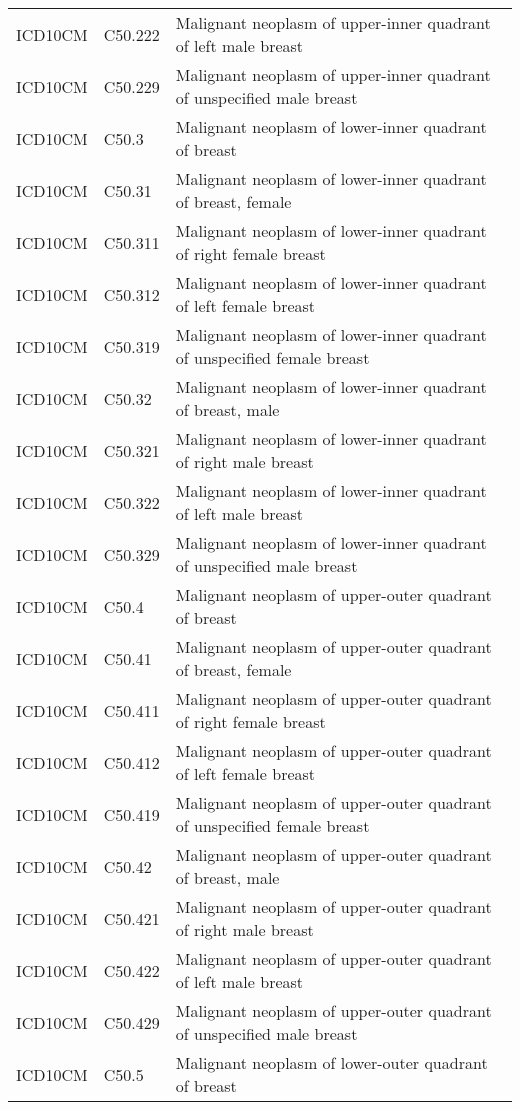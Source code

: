 \begin{longtable}{p{}p{}p{}}
  ICD10CM & C50.222 & Malignant neoplasm of upper-inner quadrant of left male breast \\ 
  ICD10CM & C50.229 & Malignant neoplasm of upper-inner quadrant of unspecified male breast \\ 
  ICD10CM & C50.3 & Malignant neoplasm of lower-inner quadrant of breast \\ 
  ICD10CM & C50.31 & Malignant neoplasm of lower-inner quadrant of breast, female \\ 
  ICD10CM & C50.311 & Malignant neoplasm of lower-inner quadrant of right female breast \\ 
  ICD10CM & C50.312 & Malignant neoplasm of lower-inner quadrant of left female breast \\ 
  ICD10CM & C50.319 & Malignant neoplasm of lower-inner quadrant of unspecified female breast \\ 
  ICD10CM & C50.32 & Malignant neoplasm of lower-inner quadrant of breast, male \\ 
  ICD10CM & C50.321 & Malignant neoplasm of lower-inner quadrant of right male breast \\ 
  ICD10CM & C50.322 & Malignant neoplasm of lower-inner quadrant of left male breast \\ 
  ICD10CM & C50.329 & Malignant neoplasm of lower-inner quadrant of unspecified male breast \\ 
  ICD10CM & C50.4 & Malignant neoplasm of upper-outer quadrant of breast \\ 
  ICD10CM & C50.41 & Malignant neoplasm of upper-outer quadrant of breast, female \\ 
  ICD10CM & C50.411 & Malignant neoplasm of upper-outer quadrant of right female breast \\ 
  ICD10CM & C50.412 & Malignant neoplasm of upper-outer quadrant of left female breast \\ 
  ICD10CM & C50.419 & Malignant neoplasm of upper-outer quadrant of unspecified female breast \\ 
  ICD10CM & C50.42 & Malignant neoplasm of upper-outer quadrant of breast, male \\ 
  ICD10CM & C50.421 & Malignant neoplasm of upper-outer quadrant of right male breast \\ 
  ICD10CM & C50.422 & Malignant neoplasm of upper-outer quadrant of left male breast \\ 
  ICD10CM & C50.429 & Malignant neoplasm of upper-outer quadrant of unspecified male breast \\ 
  ICD10CM & C50.5 & Malignant neoplasm of lower-outer quadrant of breast \\ 

\end{longtable}
